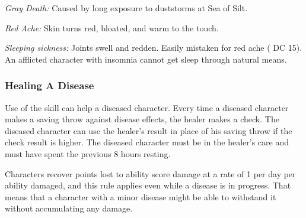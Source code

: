 \textit{Gray Death:} Caused by long exposure to duststorms at Sea of Silt.

\textit{Red Ache:} Skin turns red, bloated, and warm to the touch.

\textit{Sleeping sickness:} Joints swell and redden. Easily mistaken for red ache ( DC 15). An afflicted character with insomnia cannot get sleep through natural means.



\subsubsection{Healing A Disease}
Use of the  skill can help a diseased character. Every time a diseased character makes a saving throw against disease effects, the healer makes a check. The diseased character can use the healer's result in place of his saving throw if the  check result is higher. The diseased character must be in the healer's care and must have spent the previous 8 hours resting.

Characters recover points lost to ability score damage at a rate of 1 per day per ability damaged, and this rule applies even while a disease is in progress. That means that a character with a minor disease might be able to withstand it without accumulating any damage.